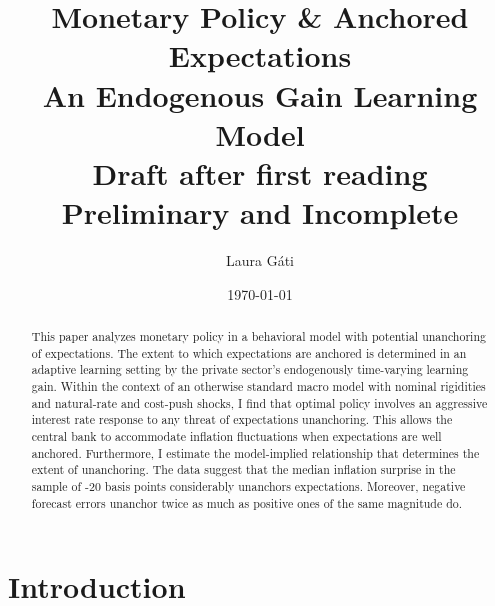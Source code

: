 \documentclass[11pt]{article}
\renewcommand{\[}{\begin{equation}}
\renewcommand{\]}{\end{equation}}
\def\movepibar{5 }
\def\movei{12 }
\begin{document}
\title{Monetary Policy \& Anchored Expectations \\
An Endogenous Gain Learning Model \\
\vspace{0.8cm}
\small{Draft after first reading \\ Preliminary and Incomplete}
}
\author{Laura G\'ati} 
\date{\today}
\maketitle


\begin{abstract}
This paper analyzes monetary policy in a behavioral model with potential unanchoring of expectations. The extent to which expectations are anchored is determined in an adaptive learning setting by the private sector's endogenously time-varying learning gain. Within the context of an otherwise standard macro model with nominal rigidities and natural-rate and cost-push shocks, I find that optimal policy involves an aggressive interest rate response to any threat of expectations unanchoring. This allows the central bank to accommodate inflation fluctuations when expectations are well anchored. Furthermore, I estimate the model-implied relationship that determines the extent of unanchoring. The data suggest that the median inflation surprise in the sample of -20 basis points considerably unanchors expectations. Moreover, negative forecast errors unanchor twice as much as positive ones of the same magnitude do. 
\end{abstract}





\newpage
\section{Introduction}\label{introduction}
\end{document}
